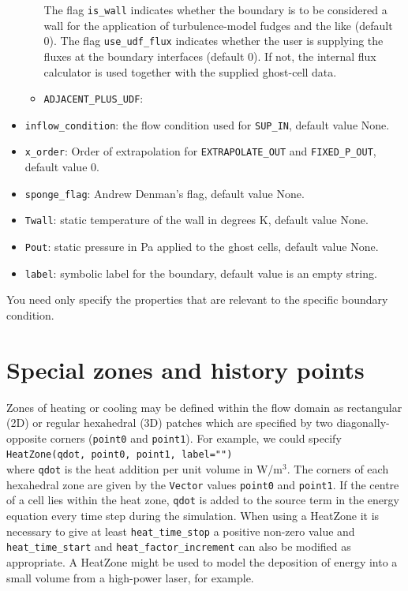 \begin{itemize}
\begin{itemize}
        The flag \texttt{is\_wall} indicates whether the boundary is to be considered
        a wall for the application of turbulence-model fudges and the like (default 0).
        The flag \texttt{use\_udf\_flux} indicates whether the user is supplying
        the fluxes at the boundary interfaces (default 0).  
        If not, the internal flux calculator is used together with the supplied ghost-cell data.
      \item \texttt{ADJACENT\_PLUS\_UDF}:
    \end{itemize}
  \item \texttt{inflow\_condition}: the flow condition used for
    \texttt{SUP\_IN}, default value None.
  \item \texttt{x\_order}: Order of extrapolation for \texttt{EXTRAPOLATE\_OUT} and 
    \texttt{FIXED\_P\_OUT}, default value 0.
  \item \texttt{sponge\_flag}: Andrew Denman's flag, default value None.
  \item \texttt{Twall}: static temperature of the wall in degrees K, default value None.
  \item \texttt{Pout}: static pressure in Pa applied to the ghost cells, default value None.
  \item \texttt{label}: symbolic label for the boundary, default value is an empty string.
\end{itemize}
You need only specify the properties that are relevant to the specific
boundary condition.

\bigskip
\section{Special zones and history points}
\label{sec:special-zones}
% 
Zones of heating or cooling may be defined within the flow domain as rectangular (2D) 
or regular hexahedral (3D) patches which are specified by two diagonally-opposite
corners (\texttt{point0} and \texttt{point1}).
For example, we could specify\\
\texttt{HeatZone(qdot, point0, point1, label="")}\\
where \texttt{qdot} is the heat addition per unit volume in W/m$^3$.
The corners of each hexahedral zone are given by the \texttt{Vector} values 
\texttt{point0} and \texttt{point1}.
If the centre of a cell lies within the heat zone, \texttt{qdot} is added to
the source term in the energy equation every time step during the simulation. When using
a HeatZone it is necessary to give at least \texttt{heat\_time\_stop} a positive non-zero
value and \texttt{heat\_time\_start} and \texttt{heat\_factor\_increment} can also be modified
as appropriate.
A HeatZone might be used to model the deposition of energy into a small volume from 
a high-power laser, for example.

